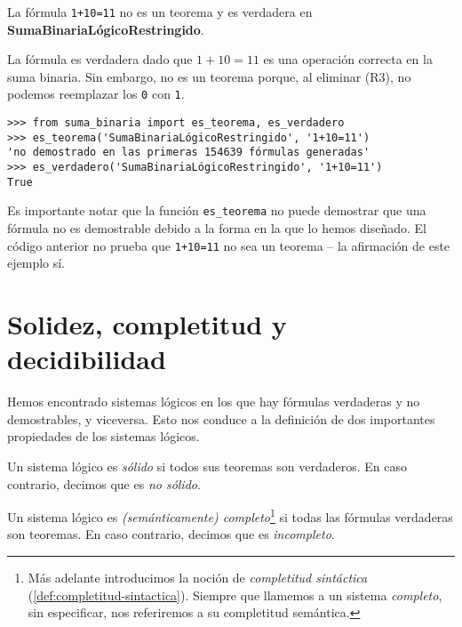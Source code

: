 \begin{ejemplo}\label{ej:suma-binaria-logico-restringido-incompleto}
La fórmula \texttt{1+10=11} no es un teorema y es verdadera en \textbf{SumaBinariaLógicoRestringido}.

La fórmula es verdadera dado que $1+10=11$ es una operación correcta en la suma binaria. Sin embargo, no es un teorema porque, al eliminar (R3), no podemos reemplazar los \texttt{0} con \texttt{1}.
\begin{lstlisting}[numbers=none,frame=none]
>>> from suma_binaria import es_teorema, es_verdadero
>>> es_teorema('SumaBinariaLógicoRestringido', '1+10=11')
'no demostrado en las primeras 154639 fórmulas generadas'
>>> es_verdadero('SumaBinariaLógicoRestringido', '1+10=11')
True
\end{lstlisting}
Es importante notar que la función \texttt{es\_teorema} no puede demostrar que una fórmula no es demostrable debido a la forma en la que lo hemos diseñado. El código anterior no prueba que \texttt{1+10=11} no sea un teorema -- la afirmación de este ejemplo sí.
\end{ejemplo}

\section{Solidez, completitud y decidibilidad}\label{sec:solidez-completitud-decidibilidad}

Hemos encontrado sistemas lógicos en los que hay fórmulas verdaderas y no demostrables, y viceversa. Esto nos conduce a la definición de dos importantes propiedades de los sistemas lógicos.

\begin{definicion}[Solidez]\label{def:solidez}
Un sistema lógico es \emph{sólido} si todos sus teoremas son verdaderos. En caso contrario, decimos que es \emph{no sólido}.
\end{definicion}

\begin{definicion}[Completitud]\label{def:completitud}
Un sistema lógico es \emph{(semánticamente) completo}\footnote{Más adelante introducimos la noción de \emph{completitud sintáctica} (\cref{def:completitud-sintactica}). Siempre que llamemos a un sistema \emph{completo}, sin especificar, nos referiremos a su completitud semántica.} si todas las fórmulas verdaderas son teoremas. En caso contrario, decimos que es \emph{incompleto}.
\end{definicion}


